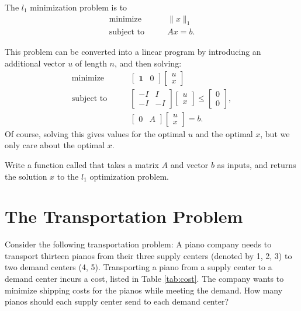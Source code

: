 The $l_1$ minimization problem is to
\begin{align*}
\text{minimize}\qquad &\|x\|_1\\
\text{subject to} \qquad &Ax = b.
\end{align*}

This problem can be converted into a linear program by introducing an additional vector $u$ of length $n$, and then solving:
\begin{align*}
\text{minimize}\qquad 
&\begin{bmatrix}
\mathbf{1} & 0
\end{bmatrix}
\begin{bmatrix}
u \\
x
\end{bmatrix}\\
\text{subject to}\qquad
&\begin{bmatrix}
-I & I\\
-I & -I
\end{bmatrix}
\begin{bmatrix}
u \\
x
\end{bmatrix}
\leq 
\begin{bmatrix}
0\\
0
\end{bmatrix},\\
&\begin{bmatrix}
0 & A
\end{bmatrix}
\begin{bmatrix}
u \\
x
\end{bmatrix}
= 
b.
\end{align*}
Of course, solving this gives values for the optimal $u$ and the optimal $x$, but we only care about the optimal $x$.

\begin{problem}
Write a function called  that takes a matrix $A$ and vector $b$ as inputs, and returns the solution $x$ to the $l_1$ optimization problem. 
\end{problem}

\section*{The Transportation Problem}

Consider the following transportation problem:
A piano company needs to transport thirteen pianos from their three  supply centers (denoted by 1, 2, 3) to two demand centers (4, 5).
Transporting a piano from a supply center to a demand center incurs a cost, listed in Table \ref{tab:cost}.
The company wants to minimize shipping costs for the pianos while meeting the demand.
How many pianos should each supply center send to each demand center?


